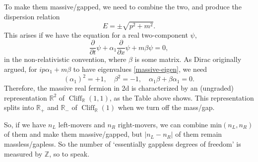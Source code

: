 \documentclass[12pt]{article}
\numberwithin{equation}{section}
\numberwithin{figure}{section}
\theoremstyle{remark}
\def\bR{\mathbb{R}}
\def\bZ{\mathbb{Z}}
\def\Cliff{\mathop{\mathrm{Cliff}}\nolimits}
\begin{document}
To make them massive/gapped, we need to combine the two, and produce the dispersion relation \begin{equation}
E=\pm\sqrt{p^2+m^2}.
\label{massive-eigen}
\end{equation} This arises if we have the equation %
for a real two-component $\psi$, %
\begin{equation}
\frac{\partial}{\partial t} \psi +\alpha_1 \frac{\partial} {\partial x}\psi  + m\beta\psi=0,
\label{nonrel-dir}
\end{equation} in the non-relativistic convention, where $\beta$ is some matrix.
As Dirac originally argued, for $ ip\alpha_1 + m\beta$ to have eigenvalues \eqref{massive-eigen},
we need \begin{equation}
(\alpha_1)^2=+1, \quad \beta^2=-1, \quad \alpha_1\beta+\beta\alpha_1=0.
\end{equation}
Therefore, the massive real fermion in 2d is characterized by an (ungraded) representation $\bR^2$ of $\Cliff_\bR(1,1)$, 
as the Table above shows.
This representation splits into $\bR_+$ and $\bR_-$ of $\Cliff_\bR(1)$ when we turn off the mass/gap.

So, if we have $n_L$ left-movers and $n_R$ right-movers, 
we can combine $\mathrm{min}(n_L,n_R)$ of them and make them massive/gapped,
but $|n_L-n_R|$ of them remain massless/gapless.
So the number of `essentially gappless degrees of freedom' is measured by $\bZ$, so to speak.
\end{document}
